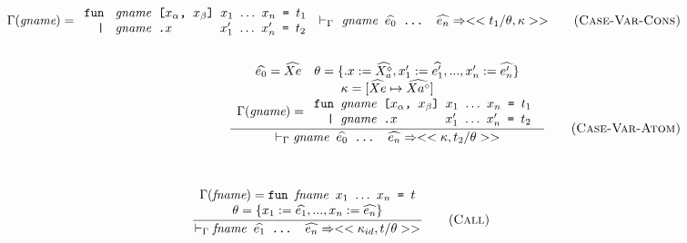 \documentclass[10pt]{../sigplanconf}
\newcommand{\nfrac}[2]{\frac{\displaystyle{#1}}{\displaystyle{#2}}}
\newcommand{\tagsc}[1]{\tag{\scshape #1}}
\begin{document}
\begin{figure*}
\begin{align}
{\begin{array}{c}
        \Gamma(\textit{gname}) =
        \begin{array}{l}
          \texttt{fun \textit{\rmfamily gname} [$x_\alpha$, $x_\beta$] $x_1$ $\ldots$ $x_n$ = $t_1$} \\
          \texttt{\ \ | \textit{\rmfamily gname}\ \texttt{.}$x$ \hspace{0.95cm} $x_1'$ $\ldots$ $x_n'$ = $t_2$} \\
        \end{array}
      \end{array}
    }{
      |-_\Gamma \texttt{\textit{\rmfamily gname} $\widehat{e_0}$ ... $\widehat{e_n}$} => <<t_1 / \theta, \kappa>>
    } \tagsc{Case-Var-Cons}
\\\nonumber\\
    \nfrac{
      \begin{array}{c}
        \widehat{e_0} = \widehat{Xe} \quad \theta = \{ .x := \widehat{X_{a}^\diamond}, x_1' := \widehat{e_1'}, ..., x_n' := \widehat{e_n'} \} \\
        \kappa = [\widehat{Xe} \mapsto \widehat{Xa^\diamond}] \\
        \Gamma(\textit{gname}) =
        \begin{array}{l}
          \texttt{fun \textit{\rmfamily gname} [$x_\alpha$, $x_\beta$] $x_1$ $\ldots$ $x_n$ = $t_1$} \\
          \texttt{\ \ | \textit{\rmfamily gname}\ \texttt{.}$x$ \hspace{0.95cm} $x_1'$ $\ldots$ $x_n'$ = $t_2$} \\
        \end{array}
      \end{array}
    }{
      |-_\Gamma \texttt{\textit{\rmfamily gname} $\widehat{e_0}$ ... $\widehat{e_n}$} => <<\kappa, t_2 / \theta>>
    } \tagsc{Case-Var-Atom}
  \end{align}

  ~\newline

  \begin{equation}
    \nfrac{
      \begin{array}{c}
        \Gamma(\textit{fname}) =
          \texttt{fun \textit{\rmfamily fname} $x_1$ $\ldots$ $x_n$ = $t$} \\
        \theta = \{ x_1 := \widehat{e_1}, ..., x_n := \widehat{e_n} \}
      \end{array}
    }{
      |-_\Gamma \texttt{\textit{\rmfamily fname} $\widehat{e_1}$ ... $\widehat{e_n}$} => << \kappa_{id}, t / \theta>>
    } \tagsc{Call}
  \end{equation}


\end{figure*}
\end{document}

